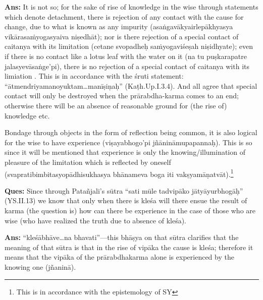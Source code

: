 \textbf{Ans:} It is not so; for the sake of rise of knowledge in the wise through statements which denote detachment, there is rejection of any contact with the cause for change, due to what is known as any impurity (asaṅgavākyairlepākhyasya vikārasaṁyogasyaiva niṣedhāt); nor is there rejection of a special contact of caitanya with its limitation (cetane svopadheḥ saṁyogaviśeṣah niṣidhyate); even if there is no contact like a lotus leaf with the water on it (na tu puṣkarapatre jalasyevāsaṅge’pi), there is no rejection of a special contact of caitanya with its limiation . This is in accordance with the śruti statement: “ātmendriyamanoyuktam…manīṣiṇaḥ” (Kaṭh.Up.I.3.4). And all agree that special contact will only be destroyed when the prārabdha-karma comes to an end; otherwise there will be an absence of reasonable ground for (the rise of) knowledge etc.

Bondage through objects in the form of reflection being common, it is also logical for the wise to have experience (viṣayabhogo’pi jñānināmupapannaḥ). This is so since it will be mentioned that experience is only the knowing/illumination of pleasure of the limitation which is reflected by oneself (svapratibimbitasyopādhisukhasya bhānameva boga iti vakṣyamāṇatvāt).\footnote{This is in accordance with the epistemology of SY} 

\textbf{Ques:} Since through Patañjali’s sūtra “sati mūle tadvipāko jātyāyurbhogāḥ” (YS.II.13) we know that only when there is kleśa will there ensue the result of karma (the question is) how can there be experience in the case of those who are wise (who have realized the truth due to absence of kleśa). 

\textbf{Ans:} “kleśābhāve…na bhavati”—this bhāṣya on that sūtra clarifies that the meaning of that sūtra is that in the rise of vipāka the cause is kleśa; therefore it means that the vipāka of the prārabdhakarma alone is experienced by the knowing one (jñaninā).


